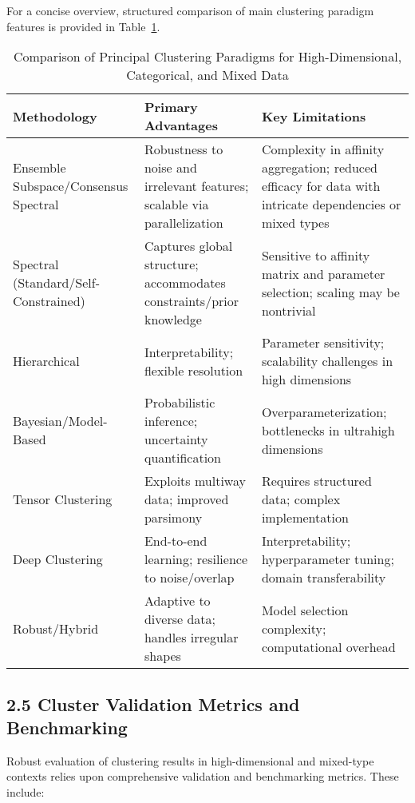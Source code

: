 \documentclass[11pt]{article}
\begin{document}
For a concise overview, structured comparison of main clustering paradigm features is provided in Table~\ref{tab:clustering_methods_comparison}.

\begin{table}[h]
    \centering
    \caption{Comparison of Principal Clustering Paradigms for High-Dimensional, Categorical, and Mixed Data}
    \label{tab:clustering_methods_comparison}
    \begin{tabular}{|p{3.4cm}|p{3.2cm}|p{5.7cm}|}
        \hline
        \textbf{Methodology} & \textbf{Primary Advantages} & \textbf{Key Limitations} \\
        \hline
        Ensemble Subspace/Consensus Spectral & Robustness to noise and irrelevant features; scalable via parallelization & Complexity in affinity aggregation; reduced efficacy for data with intricate dependencies or mixed types \\
        \hline
        Spectral (Standard/Self-Constrained) & Captures global structure; accommodates constraints/prior knowledge & Sensitive to affinity matrix and parameter selection; scaling may be nontrivial \\
        \hline
        Hierarchical & Interpretability; flexible resolution & Parameter sensitivity; scalability challenges in high dimensions \\
        \hline
        Bayesian/Model-Based & Probabilistic inference; uncertainty quantification & Overparameterization; bottlenecks in ultrahigh dimensions \\
        \hline
        Tensor Clustering & Exploits multiway data; improved parsimony & Requires structured data; complex implementation \\
        \hline
        Deep Clustering & End-to-end learning; resilience to noise/overlap & Interpretability; hyperparameter tuning; domain transferability \\
        \hline
        Robust/Hybrid & Adaptive to diverse data; handles irregular shapes & Model selection complexity; computational overhead \\
        \hline
    \end{tabular}
\end{table}

\subsection{2.5 Cluster Validation Metrics and Benchmarking}

Robust evaluation of clustering results in high-dimensional and mixed-type contexts relies upon comprehensive validation and benchmarking metrics. These include:
\end{document}
